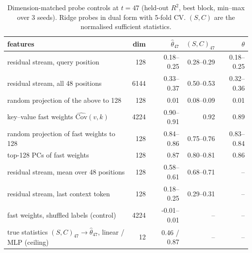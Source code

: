 \begin{table}[h]
\centering\small
\caption{Dimension-matched probe controls at $t{=}47$ (held-out $R^2$, best block, min--max over 3 seeds). Ridge probes in dual form with 5-fold CV. $(S,C)$ are the normalised sufficient statistics.}\label{tab:controls}
\begin{tabular}{lrrrr}
\toprule
features & dim & $\hat\theta_{47}$ & $(S,C)_{47}$ & $\theta$ \\
\midrule
residual stream, query position & 128 & 0.18--0.25 & 0.28--0.29 & 0.18--0.25 \\
residual stream, all 48 positions & 6144 & 0.33--0.37 & 0.50--0.53 & 0.32--0.36 \\
random projection of the above to 128 & 128 & 0.01 & 0.08--0.09 & 0.01 \\
key--value fast weights $\widehat{\mathrm{Cov}}(v,k)$ & 4224 & 0.90--0.91 & 0.92 & 0.89 \\
random projection of fast weights to 128 & 128 & 0.84--0.86 & 0.75--0.76 & 0.83--0.84 \\
top-128 PCs of fast weights & 128 & 0.87 & 0.80--0.81 & 0.86 \\
residual stream, mean over 48 positions & 128 & 0.58--0.61 & 0.68--0.71 & -- \\
residual stream, last context token & 128 & 0.18--0.25 & 0.29--0.31 & -- \\
fast weights, shuffled labels (control) & 4224 & -0.01--0.01 & -- & -- \\
\midrule
true statistics $(S,C)_{47}\to\hat\theta_{47}$, linear / MLP (ceiling) & 12 & 0.46 / 0.87 & -- & -- \\
\bottomrule
\end{tabular}
\end{table}
